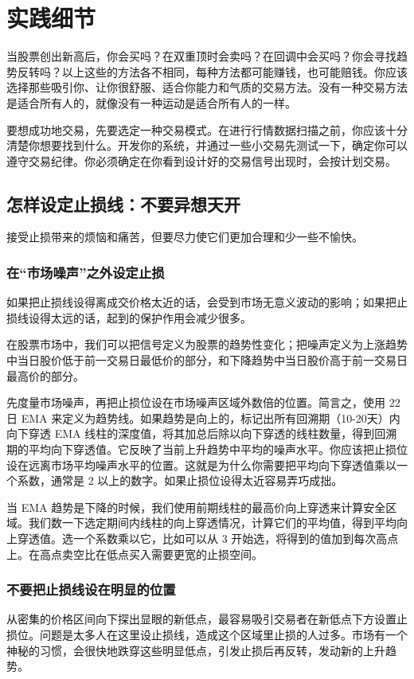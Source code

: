 \chapter{实践细节}
当股票创出新高后，你会买吗？在双重顶时会卖吗？在回调中会买吗？你会寻找趋势反转吗？以上这些的方法各不相同，每种方法都可能赚钱，也可能赔钱。你应该选择那些吸引你、让你很舒服、适合你能力和气质的交易方法。没有一种交易方法是适合所有人的，就像没有一种运动是适合所有人的一样。

要想成功地交易，先要选定一种交易模式。在进行行情数据扫描之前，你应该十分清楚你想要找到什么。开发你的系统，并通过一些小交易先测试一下，确定你可以遵守交易纪律。你必须确定在你看到设计好的交易信号出现时，会按计划交易。
\section{怎样设定止损线：不要异想天开}
接受止损带来的烦恼和痛苦，但要尽力使它们更加合理和少一些不愉快。
\subsection*{在“市场噪声”之外设定止损}
如果把止损线设得离成交价格太近的话，会受到市场无意义波动的影响；如果把止损线设得太远的话，起到的保护作用会减少很多。

在股票市场中，我们可以把信号定义为股票的趋势性变化；把噪声定义为上涨趋势中当日股价低于前一交易日最低价的部分，和下降趋势中当日股价高于前一交易日最高价的部分。

先度量市场噪声，再把止损位设在市场噪声区域外数倍的位置。简言之，使用 22 日 EMA 来定义为趋势线。如果趋势是向上的，标记出所有回溯期（10-20天）内向下穿透 EMA 线柱的深度值，将其加总后除以向下穿透的线柱数量，得到回溯期的平均向下穿透值。它反映了当前上升趋势中平均的噪声水平。你应该把止损位设在远离市场平均噪声水平的位置。这就是为什么你需要把平均向下穿透值乘以一个系数，通常是 2 以上的数字。如果止损位设得太近容易弄巧成拙。

当 EMA 趋势是下降的时候，我们使用前期线柱的最高价向上穿透来计算安全区域。我们数一下选定期间内线柱的向上穿透情况，计算它们的平均值，得到平均向上穿透值。选一个系数乘以它，比如可以从 3 开始选，将得到的值加到每次高点上。在高点卖空比在低点买入需要更宽的止损空间。
\subsection*{不要把止损线设在明显的位置}
从密集的价格区间向下探出显眼的新低点，最容易吸引交易者在新低点下方设置止损位。问题是太多人在这里设止损线，造成这个区域里止损的人过多。市场有一个神秘的习惯，会很快地跌穿这些明显低点，引发止损后再反转，发动新的上升趋势。

